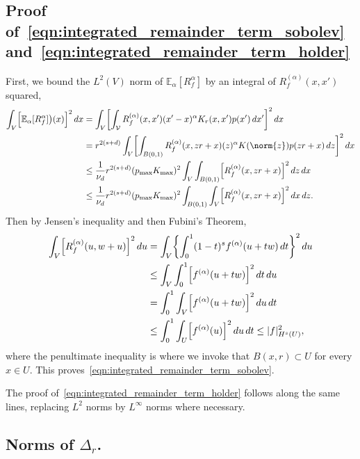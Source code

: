\documentclass{article}
\newcommand{\1}{\mathbf{1}}
\newcommand{\Vset}{\mathcal{V}}
\newcommand{\Leb}{L}
\newcommand{\Ebb}{\mathbb{E}}
\theoremstyle{alden}
\theoremstyle{aldenthm}
\theoremstyle{definition}
\theoremstyle{remark}
\begin{document}
\subsection{Proof of~\eqref{eqn:integrated_remainder_term_sobolev} and~\eqref{eqn:integrated_remainder_term_holder}}
\label{subsec:proof_integrated_remainder_terms}

First, we bound the $\Leb^2(V)$ norm of $\Ebb_{\alpha}[R_f^{\alpha}]$ by an integral of $R_f^{(\alpha)}(x,x')$ squared,
\begin{align*}
\int_{V} \Bigl[\Ebb_{\alpha}[R_f^{\alpha}]\bigr)(x)\Bigr]^2 \,dx & =  \int_{V} \biggl[\int_{\Vset} R_f^{(\alpha)}(x,x') (x' - x)^{\alpha} K_r(x,x') p(x') \,dx' \biggr]^2 \,dx \\
& = r^{2(s + d)} \int_{V} \biggl[\int_{B(0,1)} R_f^{(\alpha)}(x,zr + x) (z)^{\alpha} K(\norm{z}) p(zr + x) \,dz \biggr]^2 \,dx \\
& \leq \frac{1}{\nu_d}r^{2(s + d)} (p_{\max} K_{\max})^2 \int_{V} \int_{B(0,1)} \Bigl[R_f^{(\alpha)}(x,zr + x) \Bigr]^2  \,dz  \,dx \\
& \leq \frac{1}{\nu_d}r^{2(s + d)} (p_{\max} K_{\max})^2 \int_{B(0,1)} \int_{V}  \Bigl[R_f^{(\alpha)}(x,zr + x) \Bigr]^2  \,dx  \,dz.
\end{align*}
Then by Jensen's inequality and then Fubini's Theorem,
\begin{align*}
\int_{V} \Bigl[R_f^{(\alpha)}(u,w + u)\Bigr]^2 \,du & = \int_{V} \biggl\{\int_{0}^{1} (1 - t)^{s} f^{(\alpha)}(u + tw) \,dt  \biggr\}^2 \,du \\ 
& \leq \int_{V} \int_{0}^{1} \Bigl[f^{(\alpha)}(u + tw)\Bigr]^2 \,dt   \,du \\
& = \int_{0}^{1} \int_{V} \Bigl[f^{(\alpha)}(u + tw)\Bigr]^2 \,du  \,dt \\
& \leq \int_{0}^{1} \int_{U} \Bigl[f^{(\alpha)}(u)\Bigr]^2 \,du  \,dt \leq |f|_{H^s(U)}^2,
\end{align*}
where the penultimate inequality is where we invoke that $B(x,r) \subset U$ for every $x \in U$. This proves~\eqref{eqn:integrated_remainder_term_sobolev}.

The proof of~\eqref{eqn:integrated_remainder_term_holder} follows along the same lines, replacing $\Leb^2$ norms by $\Leb^{\infty}$ norms where necessary.

\subsection{Norms of $\Delta_r$.}
\label{subsec:proof_boundedness_expected_difference_operator}
\end{document}
